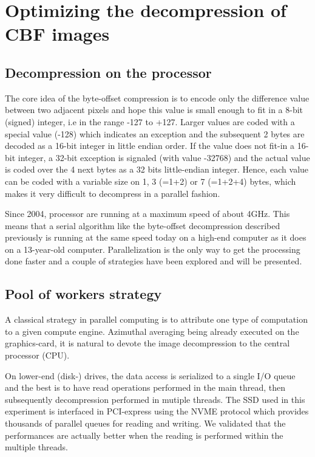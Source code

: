 \documentclass[preprint]{iucr}              %
\begin{document}
\section{Optimizing the decompression of CBF images}

\subsection{Decompression on the processor}

The core idea of the byte-offset compression is to encode only the difference
value between two adjacent pixels and hope this value is small enough to fit in
a 8-bit (signed) integer, i.e in the range -127 to +127.
Larger values are coded with a special value (-128) which indicates an exception
and the subsequent 2 bytes are decoded as a 16-bit integer in little endian
order.
If the value does not fit-in a 16-bit integer, a 32-bit exception is
signaled (with value -32768) and the actual value is coded over the 4 next bytes
as a 32 bits little-endian integer.
Hence, each value can be coded with a variable size on 1, 3 (=1+2) or 7 (=1+2+4)
bytes, which makes it very difficult to decompress in a parallel fashion.

Since 2004, processor are running at a maximum speed of about 4GHz. 
This means that a serial algorithm like the byte-offset decompression described
previously is running at the same speed today on a high-end computer as it
does on a 13-year-old computer.
Parallelization is the only way to get the processing done faster and a couple
of strategies have been explored and will be presented.

\subsection{Pool of workers strategy} 

A classical strategy in parallel computing is to attribute one type of
computation to a given compute engine.
Azimuthal averaging being already executed on the graphics-card, it is natural
to devote the image decompression to the central processor (CPU).

On lower-end (disk-) drives, the data access is serialized to a single
I/O queue and the best is to have read operations performed in the main
thread, then subsequently decompression performed in mutiple threads.
The SSD used in this experiment is interfaced in PCI-express using the NVME
protocol \cite{nvme} which provides thousands of parallel queues for reading
and writing.
We validated that the performances are actually better when the reading is
performed within the multiple threads.
\end{document}
